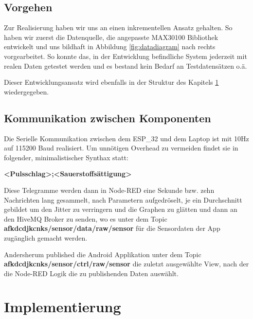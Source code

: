\documentclass[12pt,oneside]{article}
\begin{document}
  \subsection{Vorgehen}
	Zur Realisierung haben wir uns an einen inkrementellen Ansatz gehalten. So haben wir zuerst die Datenquelle, die angepasste MAX30100 Bibliothek entwickelt und uns bildhaft in Abbildung \ref{fig:datadiagram} nach rechts vorgearbeitet. So konnte das, in der Entwicklung befindliche System jederzeit mit realen Daten getestet werden und es bestand kein Bedarf an Testdatensätzen o.ä.\par
	Dieser Entwicklungsansatz wird ebenfalls in der Struktur des Kapitels \ref{sec:implementation} wiedergegeben.
  \subsection{Kommunikation zwischen Komponenten}
	\label{subsec:internalCommunication}
	Die Serielle Kommunikation zwischen dem ESP\_32 und dem Laptop ist mit 10Hz auf 115200 Baud realisiert. Um unnötigen Overhead zu vermeiden findet sie in folgender, minimalistischer Synthax statt:\par
	\textbf{<Pulsschlag>;<Sauerstoffsättigung>}\par
	Diese Telegramme werden dann in Node-RED\cite{nodeRED} eine Sekunde bzw. zehn Nachrichten lang gesammelt, nach Parametern aufgedröselt, je ein Durchschnitt gebildet um den Jitter zu verringern und die Graphen zu glätten und dann an den HiveMQ Broker\cite{hiveMQ} zu senden, wo es unter dem Topic \textbf{afkdcdjkcnks/sensor/data/raw/sensor} für die Sensordaten der App zugänglich gemacht werden.\par
	Andersherum published die Android Applikation unter dem Topic \textbf{afkdcdjkcnks/sensor/ctrl/raw/sensor} die zuletzt ausgewählte View, nach der die Node-RED Logik die zu publishenden Daten auswählt.
  
  
  
  
  
  \section{Implementierung}
  \label{sec:implementation}
  
\end{document}
